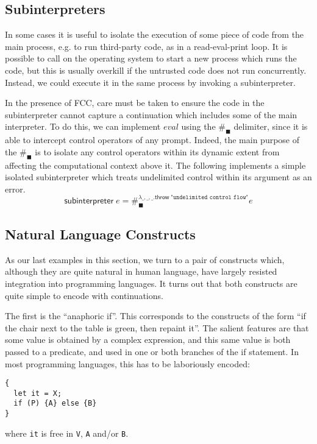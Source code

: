 \documentclass[11pt]{article}
\newcommand{\maybePage}{\newpage}
\begin{document}
\maybePage
\subsection{Subinterpreters}

In some cases it is useful to isolate the execution of some piece of code from the main process, e.g. to run third-party code, as in a read-eval-print loop.
It is possible to call on the operating system to start a new process which runs the code, but this is usually overkill if the untrusted code does not run concurrently.
Instead, we could execute it in the same process by invoking a subinterpreter.

In the presence of FCC, care must be taken to ensure the code in the subinterpreter cannot capture a continuation which includes some of the main interpreter.
To do this, we can implement $eval$ using the $\#_\blacksquare$ delimiter, since it is able to intercept control operators of any prompt.
Indeed, the main purpose of the $\#_\blacksquare$ is to isolate any control operators within its dynamic extent from affecting the computational context above it.
The following implements a simple isolated subinterpreter which treats undelimited control within its argument as an error.
$$\textsf{subinterpreter}\;e = \#_\blacksquare^{\lambda\_,\_,\_.\textsf{throw}\;\texttt{"undelimited control flow"}}e$$


\maybePage
\subsection{Natural Language Constructs}

As our last examples in this section, we turn to a pair of constructs which, although they are quite natural in human language, have largely resisted integration into programming languages.
It turns out that both constructs are quite simple to encode with continuations.

The first is the ``anaphoric if''.
This corresponds to the constructs of the form ``if the chair next to the table is green, then repaint it''.
The salient features are that some value is obtained by a complex expression, and this same value is both passed to a predicate, and used in one or both branches of the if statement.
In most programming languages, this has to be laboriously encoded:
\begin{verbatim}
{
  let it = X;
  if (P) {A} else {B}
}
\end{verbatim}
where \texttt{it} is free in \texttt{V}, \texttt{A} and/or \texttt{B}.
\end{document}

